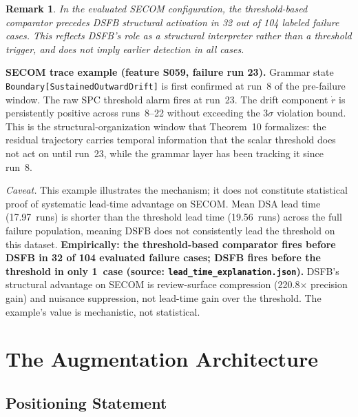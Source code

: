 \documentclass[11pt,letterpaper]{article}
\theoremstyle{scresult}
\newtheorem{remark}{Remark}
\begin{document}
\begin{remark}
In the evaluated SECOM configuration, the threshold-based comparator precedes
DSFB structural activation in 32 out of 104 labeled failure cases.
This reflects DSFB's role as a structural interpreter rather than a threshold
trigger, and does not imply earlier detection in all cases.
\end{remark}

\begin{tcolorbox}[claimbox]
\textbf{SECOM trace example (feature S059, failure run 23).}
Grammar state \texttt{Boundary[SustainedOutwardDrift]} is first confirmed at
run~8 of the pre-failure window. The raw SPC threshold alarm fires at run~23.
The drift component $\dot{r}$ is persistently positive across runs~8--22 without
exceeding the $3\sigma$ violation bound. This is the structural-organization
window that Theorem~10 formalizes: the residual trajectory carries temporal
information that the scalar threshold does not act on until run~23, while the
grammar layer has been tracking it since run~8.

\textit{Caveat.} This example illustrates the mechanism; it does not constitute
statistical proof of systematic lead-time advantage on SECOM. Mean DSA lead time
(17.97~runs) is shorter than the threshold lead time (19.56~runs) across the
full failure population, meaning DSFB does not consistently lead the threshold
on this dataset. \textbf{Empirically: the threshold-based comparator fires
before DSFB in 32 of 104 evaluated failure cases; DSFB fires before the
threshold in only 1~case (source: \texttt{lead\_time\_explanation.json}).}
DSFB's structural advantage on SECOM is review-surface compression (220.8$\times$
precision gain) and nuisance suppression, not lead-time gain over the threshold.
The example's value is mechanistic, not statistical.
\end{tcolorbox}

\section{The Augmentation Architecture}
\label{sec:augmentation}

\subsection{Positioning Statement}
\end{document}
